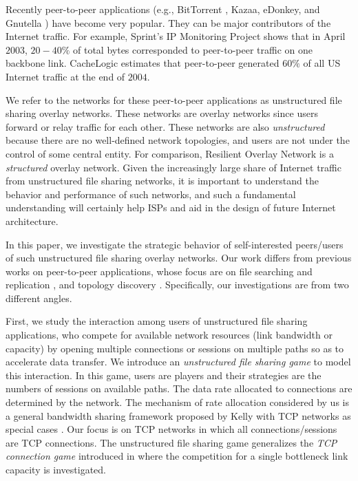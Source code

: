 \documentclass[conference]{IEEEtran}
\begin{document}
\noindent Recently peer-to-peer applications (e.g., BitTorrent
\cite{bt}, Kazaa, eDonkey, and Gnutella \cite{p2p}) have become
very popular. They can be major contributors of the Internet
traffic. For example, Sprint's IP Monitoring Project \cite{sprint}
shows that in April $2003$, $20-40\%$ of total bytes corresponded
to peer-to-peer traffic on one backbone link. CacheLogic
\cite{cachelogic} estimates that peer-to-peer generated $60\%$ of
all US Internet traffic at the end of $2004$.

We refer to the networks for these peer-to-peer applications as
unstructured file sharing overlay networks. These networks are
overlay networks since users forward or relay traffic for each
other. These networks are also \textit{unstructured} because there
are no well-defined network topologies, and users are not under
the control of some central entity. For comparison,
Resilient Overlay Network \cite{andersen01resilient} is a
\textit{structured} overlay network.
Given the increasingly large share of Internet traffic from
unstructured file sharing networks, it is important to understand
the behavior and performance of such networks, and such a
fundamental understanding will certainly help ISPs and aid in the
design of future Internet architecture.

In this paper, we investigate the strategic behavior of
self-interested peers/users of such unstructured file sharing
overlay networks. Our work differs from  previous works on
peer-to-peer applications, whose focus are on file searching and
replication \cite{cohen02replication}, and topology discovery
\cite{stutzbach05p2p}. Specifically, our investigations are from
two different angles.

First, we study the interaction among users of unstructured file
sharing applications, who compete for available network resources
(link bandwidth or capacity) by opening multiple connections or
sessions on multiple paths so as to accelerate data transfer. We
introduce an \textit{unstructured file sharing game} to model this
interaction. In this game, users are players and their strategies
are the numbers of sessions on available paths. The data rate
allocated to connections are determined by the network. The
mechanism of rate allocation considered by us is a general
bandwidth sharing framework proposed by Kelly \cite{kelly98rate}
with TCP networks as special cases
\cite{bonald01impact}\cite{mo00fair}. Our focus is on TCP networks
in which all connections/sessions are TCP connections. The
unstructured file sharing game generalizes the \textit{TCP
connection game} introduced in \cite{zhang05tcpgame_icnp} where
the competition for a single bottleneck link capacity is
investigated.
\end{document}
